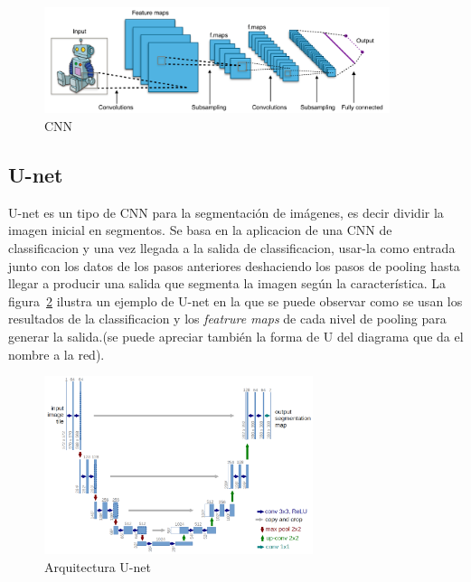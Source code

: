      \begin{figure}[H]
        \centering
        \includegraphics[width=0.9\textwidth]{cnn}
        \caption{CNN \cite{aphex34_english_2015} }%
        \label{fig:cnn}
     \end{figure}
    
    \subsection{U-net}
    
    U-net es un tipo de CNN para la segmentación de imágenes, es decir dividir la imagen inicial en
    segmentos. Se basa en la aplicacion de una CNN de classificacion y una vez llegada a la salida de
    classificacion, usar-la como entrada junto con los datos de los pasos anteriores deshaciendo los
    pasos de pooling hasta llegar a producir una salida que segmenta la imagen según la característica.
    La figura~\ref{fig:unet} ilustra un ejemplo de U-net en la que se puede observar como se usan
    los resultados de la classificacion y los \emph{featrure maps} de cada nivel de pooling para
    generar la salida.(se puede apreciar también la forma de U del diagrama que da el nombre a la red).
    
     \begin{figure}[H]
        \centering
        \includegraphics[width=0.7\textwidth]{unet}
        \caption{Arquitectura U-net \cite{sankesara_u-net_2019}}%
        \label{fig:unet}
     \end{figure}
     
